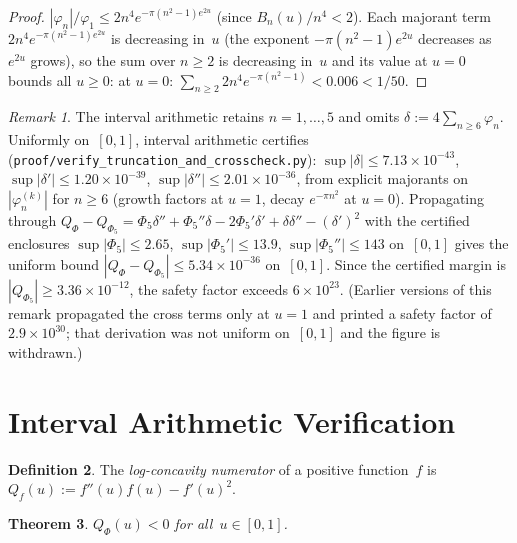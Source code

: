 \documentclass[11pt]{article}
\newtheorem{theorem}{Theorem}
\theoremstyle{definition}
\newtheorem{definition}[theorem]{Definition}
\theoremstyle{remark}
\newtheorem{remark}[theorem]{Remark}
\begin{document}
\begin{proof}
$|\varphi_n|/\varphi_1 \leq 2n^4 e^{-\pi(n^2-1)e^{2u}}$ (since $B_n(u)/n^4 < 2$).
Each majorant term $2n^4 e^{-\pi(n^2-1)e^{2u}}$ is decreasing in~$u$
(the exponent $-\pi(n^2-1)e^{2u}$ decreases as $e^{2u}$ grows), so the
sum over $n \geq 2$ is decreasing in~$u$ and its value at $u = 0$ bounds
all $u \geq 0$:
at $u = 0$: $\sum_{n\geq 2} 2n^4 e^{-\pi(n^2-1)} < 0.006 < 1/50$.
\end{proof}

\begin{remark}\label{rem:truncation}
The interval arithmetic retains $n = 1,\ldots,5$ and omits
$\delta := 4\sum_{n \geq 6}\varphi_n$.
Uniformly on~$[0,1]$, interval arithmetic certifies
(\texttt{proof/verify\_truncation\_and\_crosscheck.py}):
$\sup|\delta| \leq 7.13 \times 10^{-43}$,
$\sup|\delta'| \leq 1.20 \times 10^{-39}$,
$\sup|\delta''| \leq 2.01 \times 10^{-36}$,
from explicit majorants on $|\varphi_n^{(k)}|$ for $n \geq 6$
(growth factors at $u=1$, decay $e^{-\pi n^2}$ at $u=0$).
Propagating through
$Q_\Phi - Q_{\Phi_5} = \Phi_5\delta'' + \Phi_5''\delta
- 2\Phi_5'\delta' + \delta\delta'' - (\delta')^2$
with the certified enclosures
$\sup|\Phi_5| \leq 2.65$, $\sup|\Phi_5'| \leq 13.9$,
$\sup|\Phi_5''| \leq 143$ on~$[0,1]$ gives the uniform bound
$|Q_\Phi - Q_{\Phi_5}| \leq 5.34 \times 10^{-36}$ on~$[0,1]$.
Since the certified margin is $|Q_{\Phi_5}| \geq 3.36 \times 10^{-12}$,
the safety factor exceeds $6 \times 10^{23}$.
(Earlier versions of this remark propagated the cross terms only at
$u=1$ and printed a safety factor of $2.9 \times 10^{30}$; that
derivation was not uniform on~$[0,1]$ and the figure is withdrawn.)
\end{remark}

\section{Interval Arithmetic Verification}
\label{sec:ia}

\begin{definition}
The \emph{log-concavity numerator} of a positive function~$f$ is
$Q_f(u) := f''(u)f(u) - f'(u)^2$.
\end{definition}

\begin{theorem}\label{thm:ia}
$Q_\Phi(u) < 0$ for all~$u \in [0, 1]$.
\end{theorem}
\end{document}
